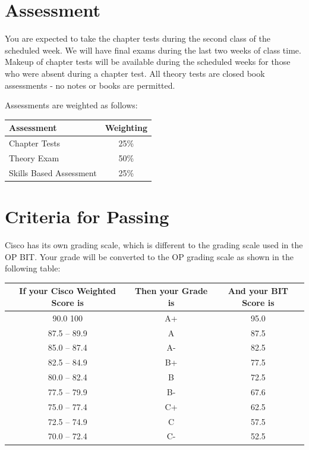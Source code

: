 \documentclass{article}
\begin{document}
\section*{Assessment}
You are expected to take the chapter tests during the second class of the scheduled week. We
will have final exams during the last two weeks of class time.  Makeup of chapter tests will
be available during the scheduled weeks for those who were absent during a chapter test.  All theory
tests are closed book assessments - no notes or books are permitted.

\vspace{1\baselineskip}

Assessments are weighted as follows: \\
\begin{tabular}{|l|c|}
\hline
Assessment              &  Weighting \\ \hline
Chapter Tests           &  25\% \\ \hline
Theory Exam             &  50\% \\ \hline
Skills Based Assessment &  25\% \\ \hline
\end{tabular}

\section*{Criteria for Passing}
Cisco has its own grading scale, which is different to the grading scale used in the OP BIT. Your grade will be converted to the OP grading scale as shown in the following table:

\begin{tabular}{|c|c|c|}
\hline
If your Cisco Weighted Score is &	Then your Grade is	& And your BIT Score is \\ \hline
90.0   100	                    &   A+	                & 95.0 \\ \hline
87.5 – 89.9	                    &   A	                & 87.5 \\ \hline
85.0 – 87.4	                    &   A-	                & 82.5 \\ \hline
82.5 – 84.9	                    &   B+	                & 77.5 \\ \hline
80.0 – 82.4	                    &   B	                & 72.5 \\ \hline
77.5 – 79.9	                    &   B-	                & 67.6 \\ \hline
75.0 – 77.4	                    &   C+	                & 62.5 \\ \hline
72.5 – 74.9	                    &   C                   & 57.5 \\ \hline
70.0 – 72.4	                    &   C-	                & 52.5 \\ \hline
\end{tabular}
\end{document}
